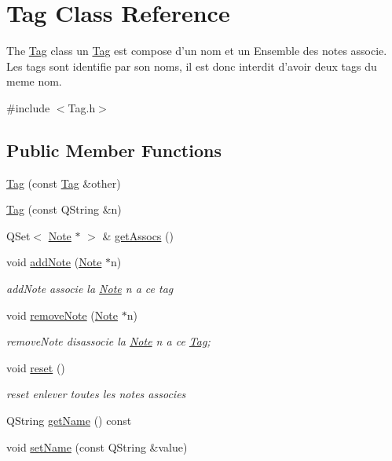 \hypertarget{class_tag}{\section{Tag Class Reference}
\label{class_tag}
}


The \hyperlink{class_tag}{Tag} class un \hyperlink{class_tag}{Tag} est compose d'un nom et un Ensemble des notes associe. Les tags sont identifie par son noms, il est donc interdit d'avoir deux tags du meme nom.  




{\ttfamily \#include $<$Tag.\-h$>$}

\subsection*{Public Member Functions}
\begin{DoxyCompactItemize}
\item 
\hyperlink{class_tag_a6e193d6733a9b58601f1431bce98878f}{Tag} (const \hyperlink{class_tag}{Tag} \&other)
\item 
\hyperlink{class_tag_acf02cf8c2c12fd7db3c853ec75f6d5da}{Tag} (const Q\-String \&n)
\item 
Q\-Set$<$ \hyperlink{class_note}{Note} $\ast$ $>$ \& \hyperlink{class_tag_af1f12b374b472a04819f474b841be420}{get\-Assocs} ()
\item 
void \hyperlink{class_tag_a4cd05092b9987525ad7a7899ee7a8979}{add\-Note} (\hyperlink{class_note}{Note} $\ast$n)
\begin{DoxyCompactList}\small\item\em add\-Note associe la \hyperlink{class_note}{Note} n a ce tag \end{DoxyCompactList}\item 
void \hyperlink{class_tag_a60d93267494889c1db6cbeff156419c8}{remove\-Note} (\hyperlink{class_note}{Note} $\ast$n)
\begin{DoxyCompactList}\small\item\em remove\-Note disassocie la \hyperlink{class_note}{Note} n a ce \hyperlink{class_tag}{Tag}; \end{DoxyCompactList}\item 
void \hyperlink{class_tag_a9ce786eb87a1abe35bf8cd72f1d4ec21}{reset} ()
\begin{DoxyCompactList}\small\item\em reset enlever toutes les notes associes \end{DoxyCompactList}\item 
Q\-String \hyperlink{class_tag_a9458f47f8f40bdc90788c7f7b7793b8a}{get\-Name} () const 
\item 
void \hyperlink{class_tag_aa7392a4cfa2465bedebca2d4bf57cf66}{set\-Name} (const Q\-String \&value)
\end{DoxyCompactItemize}


